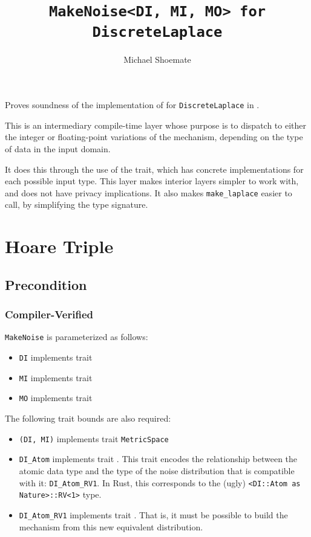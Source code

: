 \documentclass{article}
\title{\texttt{MakeNoise<DI, MI, MO> for DiscreteLaplace}}
\author{Michael Shoemate}
\date{}
\begin{document}
\maketitle

\contrib
Proves soundness of the implementation of  
for \texttt{DiscreteLaplace} in .

This is an intermediary compile-time layer whose purpose is 
to dispatch to either the integer or floating-point variations of the mechanism,
depending on the type of data in the input domain.

It does this through the use of the  trait,
which has concrete implementations for each possible input type.
This layer makes interior layers simpler to work with, and does not have privacy implications.
It also makes \texttt{make\_laplace} easier to call,
by simplifying the type signature.

\section{Hoare Triple}
\subsection*{Precondition}
\subsubsection*{Compiler-Verified}
\texttt{MakeNoise} is parameterized as follows:
\begin{itemize}
    \item \texttt{DI} implements trait 
    \item \texttt{MI} implements trait 
    \item \texttt{MO} implements trait 
\end{itemize}

The following trait bounds are also required:
\begin{itemize}
    \item \texttt{(DI, MI)} implements trait \texttt{MetricSpace}
    \item \texttt{DI\_Atom} implements trait .
        This trait encodes the relationship between the atomic data type 
        and the type of the noise distribution that is compatible with it: \texttt{DI\_Atom\_RV1}.
        In Rust, this corresponds to the (ugly) \texttt{<DI::Atom as Nature>::RV<1>} type.
    \item \texttt{DI\_Atom\_RV1} implements trait .
        That is, it must be possible to build the mechanism from this new equivalent distribution.
\end{itemize}
\end{document}
